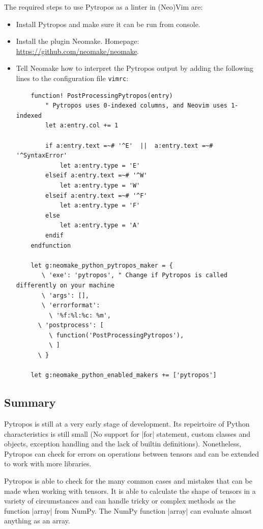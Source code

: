 The required steps to use Pytropos as a linter in (Neo)Vim are:

\begin{itemize}
\tightlist
\item Install Pytropos and make sure it can be run from console.
\item Install the plugin Neomake. Homepage: \url{https://github.com/neomake/neomake}.
\item Tell Neomake how to interpret the Pytropos output by adding the following lines to
  the configuration file \verb|vimrc|:
  \begin{verbatim}
    function! PostProcessingPytropos(entry)
        " Pytropos uses 0-indexed columns, and Neovim uses 1-indexed
        let a:entry.col += 1

        if a:entry.text =~# '^E'  ||  a:entry.text =~# '^SyntaxError'
            let a:entry.type = 'E'
        elseif a:entry.text =~# '^W'
            let a:entry.type = 'W'
        elseif a:entry.text =~# '^F'
            let a:entry.type = 'F'
        else
            let a:entry.type = 'A'
        endif
    endfunction

    let g:neomake_python_pytropos_maker = {
       \ 'exe': 'pytropos', " Change if Pytropos is called differently on your machine
       \ 'args': [],
       \ 'errorformat':
         \ '%f:%l:%c: %m',
      \ 'postprocess': [
         \ function('PostProcessingPytropos'),
         \ ]
      \ }

    let g:neomake_python_enabled_makers += ['pytropos']
  \end{verbatim}
\end{itemize}

\subsection*{Summary}

Pytropos is still at a very early stage of development. Its repeirtoire of Python
characteristics is still small (No support for \pycode|for| statement, custom classes and
objects, exception handling and the lack of builtin definitions). Nonetheless, Pytropos
can check for errors on operations between tensors and can be extended to work with more
libraries.

Pytropos is able to check for the many common cases and mistakes that can be made when
working with tensors. It is able to calculate the shape of tensors in a variety of
circumstances and can handle tricky or complex methods as the function \pycode|array| from
NumPy. The NumPy function \pycode|array| can evaluate almost anything as an array.
